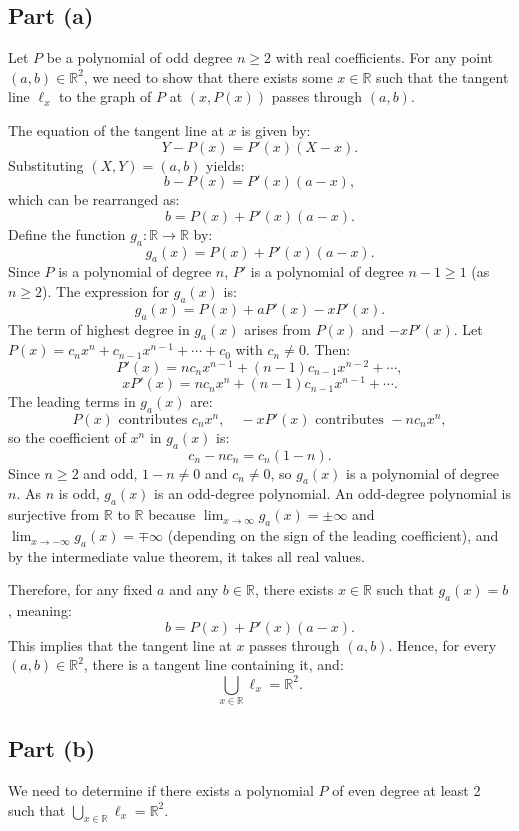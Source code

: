 \documentclass[12pt,a4paper]{article}
\theoremstyle{definition}
\begin{document}
\subsection*{Part (a)}
Let $P$ be a polynomial of odd degree $n \geq 2$ with real coefficients. For any point $(a, b) \in \mathbb{R}^2$, we need to show that there exists some $x \in \mathbb{R}$ such that the tangent line $\ell_x$ to the graph of $P$ at $(x, P(x))$ passes through $(a, b)$.

The equation of the tangent line at $x$ is given by:
\[
Y - P(x) = P'(x)(X - x).
\]
Substituting $(X, Y) = (a, b)$ yields:
\[
b - P(x) = P'(x)(a - x),
\]
which can be rearranged as:
\[
b = P(x) + P'(x)(a - x).
\]
Define the function $g_a : \mathbb{R} \to \mathbb{R}$ by:
\[
g_a(x) = P(x) + P'(x)(a - x).
\]
Since $P$ is a polynomial of degree $n$, $P'$ is a polynomial of degree $n-1 \geq 1$ (as $n \geq 2$). The expression for $g_a(x)$ is:
\[
g_a(x) = P(x) + a P'(x) - x P'(x).
\]
The term of highest degree in $g_a(x)$ arises from $P(x)$ and $-x P'(x)$. Let $P(x) = c_n x^n + c_{n-1} x^{n-1} + \cdots + c_0$ with $c_n \neq 0$. Then:
\[
P'(x) = n c_n x^{n-1} + (n-1) c_{n-1} x^{n-2} + \cdots,
\]
\[
x P'(x) = n c_n x^n + (n-1) c_{n-1} x^{n-1} + \cdots.
\]
The leading terms in $g_a(x)$ are:
\[
P(x) \text{ contributes } c_n x^n, \quad -x P'(x) \text{ contributes } -n c_n x^n,
\]
so the coefficient of $x^n$ in $g_a(x)$ is:
\[
c_n - n c_n = c_n (1 - n).
\]
Since $n \geq 2$ and odd, $1 - n \neq 0$ and $c_n \neq 0$, so $g_a(x)$ is a polynomial of degree $n$. As $n$ is odd, $g_a(x)$ is an odd-degree polynomial. An odd-degree polynomial is surjective from $\mathbb{R}$ to $\mathbb{R}$ because $\lim_{x \to \infty} g_a(x) = \pm \infty$ and $\lim_{x \to -\infty} g_a(x) = \mp \infty$ (depending on the sign of the leading coefficient), and by the intermediate value theorem, it takes all real values.

Therefore, for any fixed $a$ and any $b \in \mathbb{R}$, there exists $x \in \mathbb{R}$ such that $g_a(x) = b$, meaning:
\[
b = P(x) + P'(x)(a - x).
\]
This implies that the tangent line at $x$ passes through $(a, b)$. Hence, for every $(a, b) \in \mathbb{R}^2$, there is a tangent line containing it, and:
\[
\bigcup_{x \in \mathbb{R}} \ell_x = \mathbb{R}^2.
\]

\subsection*{Part (b)}
We need to determine if there exists a polynomial $P$ of even degree at least 2 such that $\bigcup_{x \in \mathbb{R}} \ell_x = \mathbb{R}^2$.
\end{document}
